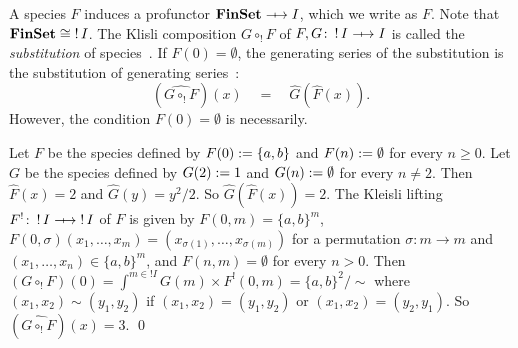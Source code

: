 A species \( F \) induces a profunctor \( \FinSet \profarrow I \), which we write as \( F \).
Note that \( \mathbf{FinSet} \cong \mathop{!}I \).
The Klisli composition \( G \circ_! F \) of \( F, G \colon \mathop{!}I \profarrow I \) is called the \emph{substitution} of species~\cite{FioreSpecies}.
If \( F(0) = \emptyset \), the generating series of the substitution is the substitution of generating series~\cite[Lem???]{Joyal?}:
\begin{equation*}
    (\widehat{G \circ_! F})(x)
    \quad=\quad
    \widehat{G}(\widehat{F}(x)).
\end{equation*}
However, the condition \( F(0) = \emptyset \) is necessarily.
\begin{example}
    Let \( F \) be the species defined by \( F(0) := \{ a, b \} \) and \( F(n) := \emptyset \) for every \( n \ge 0 \).
    Let \( G \) be the species defined by \( G(2) := 1 \) and \( G(n) := \emptyset \) for every \( n \neq 2 \).
    Then \( \widehat{F}(x) = 2 \) and \( \widehat{G}(y) = y^2/2 \).
    So \( \widehat{G}(\widehat{F}(x)) = 2 \).
    The Kleisli lifting \( F^! \colon \mathop{!}I \profarrow \mathop{!}I \) of \( F \) is given by \( F(0,m) = \{ a, b \}^m \), \( F(0, \sigma)(x_1,\dots,x_m) = (x_{\sigma(1)}, \dots, x_{\sigma(m)}) \) for a permutation \( \sigma \colon m \to m \) and \( (x_1,\dots,x_n) \in \{ a,b \}^m \), and \( F(n,m) = \emptyset \) for every \( n > 0 \).
    Then \( (G \circ_! F)(0) = \int^{m \in \mathop{!}I} G(m) \times F^!(0, m) = \{ a, b \}^2/{\sim} \) where \( (x_1,x_2) \sim (y_1,y_2) \) if \( (x_1,x_2) = (y_1,y_2) \) or \( (x_1,x_2) = (y_2,y_1) \).
    So \( (\widehat{G \circ_! F})(x) = 3 \).
    \qed
\end{example}

